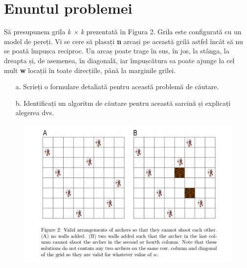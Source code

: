 \documentclass{article}
\begin{document}
\newpage
\section{Enuntul problemei}
\vspace{1cm}
\hspace{1cm}Să presupunem grila \textit{k × k} prezentată în Figura 2. Grila este configurată cu un model de pereți. Vi se cere să plasați \textbf{n} arcași pe această grilă astfel încât să nu se poată împușca reciproc. Un arcaș poate trage în sus, în jos, la stânga, la dreapta și, de asemenea, în diagonală, iar împușcătura sa poate ajunge la cel mult \textbf{w} locații în toate direcțiile, până la marginile grilei. \\
\begin{itemize}
\item[a.] Scrieți o formulare detaliată pentru această problemă de căutare. \\
\item[b.] Identificați un algoritm de căutare pentru această sarcină și explicați alegerea dvs.
\end{itemize}
\begin{figure}[htbp!]
\centering
\includegraphics[scale=0.9]{archers}
\end{figure}

\newpage 
\end{document}
